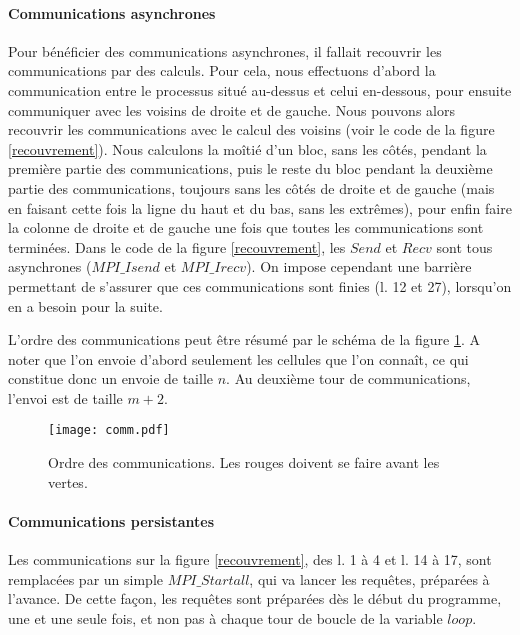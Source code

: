 \paragraph{Communications asynchrones}
Pour bénéficier des communications asynchrones, il fallait recouvrir les communications par des calculs. Pour cela, nous effectuons d'abord la communication entre le processus situé au-dessus et celui en-dessous, pour ensuite communiquer avec les voisins de droite et de gauche. Nous pouvons alors recouvrir les communications avec le calcul des voisins (voir le code de la figure \ref{recouvrement}). 
Nous calculons la moîtié d'un bloc, sans les côtés, pendant la première partie des communications, puis le reste du bloc pendant la deuxième partie des communications, toujours sans les côtés de droite et de gauche (mais en faisant cette fois la ligne du haut et du bas, sans les extrêmes), pour enfin faire la colonne de droite et de gauche une fois que toutes les communications sont terminées. 
Dans le code de la figure \ref{recouvrement}, les $Send$ et $Recv$ sont tous asynchrones ($MPI\_Isend$ et $MPI\_Irecv$). On impose cependant une barrière permettant de s'assurer que ces communications sont finies (l. 12 et 27), lorsqu'on en a besoin pour la suite.

L'ordre des communications peut être résumé par le schéma de la figure \ref{fig:comm}. A noter que l'on envoie d'abord seulement les cellules que l'on connaît, ce qui constitue donc un envoie de taille $n$. Au deuxième tour de communications, l'envoi est de taille $m+2$.

\begin{figure}[!ht]
\centering
\texttt{[image: comm.pdf]}
\caption{Ordre des communications. Les rouges doivent se faire avant les vertes.}
\label{fig:comm}
\end{figure}

\paragraph{Communications persistantes}
Les communications sur la figure \ref{recouvrement}, des l. 1 à 4 et l. 14 à 17, sont remplacées par un simple $MPI\_Startall$, qui va lancer les requêtes, préparées à l'avance. De cette façon, les requêtes sont préparées dès le début du programme, une et une seule fois, et non pas à chaque tour de boucle de la variable $loop$. 